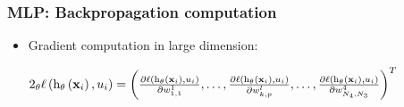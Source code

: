 \begin{frame}
\begin{textblock}{50}
\begin{center}
    \end{center}
  \end{textblock}
\end{frame}

\begin{frame}
  \frametitle{\acl{MLP}: Backpropagation computation}
  \begin{itemize}
    \item Gradient computation in large dimension:

    $
    2_{\mathbf{\theta}} \mathrm{\ell} \left ( {\mathrm{h}_{\mathbf{\theta}} \left ( {\mathbf{x}_i} \right ), u_i} \right ) =
    \left( \frac{\partial \mathrm{\ell} \left ( {\mathrm{h}_{\mathbf{\theta}} \left ( {\mathbf{x}_i} \right ), u_i} \right ) }{\partial w_{1,1}^1},\ldots,\frac{\partial \mathrm{\ell} \left ( {\mathrm{h}_{\mathbf{\theta}} \left ( {\mathbf{x}_i} \right ), u_i} \right ) }{\partial w_{k,p}^l},\ldots,\frac{\partial \mathrm{\ell} \left ( {\mathrm{h}_{\mathbf{\theta}} \left ( {\mathbf{x}_i} \right ), u_i} \right ) }{\partial w_{N_{4},N_{3}}^{4}} \right)^T
    $


\end{itemize}
\end{frame}
